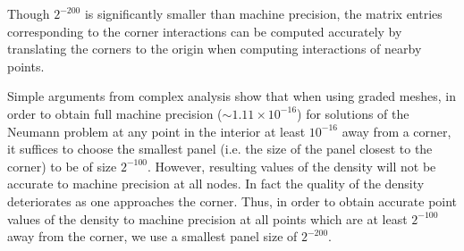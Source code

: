 \begin{rem}
Though $2^{-200}$ is significantly smaller than machine precision, the matrix entries corresponding to the
corner interactions can be computed accurately by translating the corners to the origin when 
computing interactions of nearby points.
\end{rem} 
\begin{rem}
Simple arguments from complex analysis show that when using graded meshes, in order to obtain full 
machine precision 
($\sim 1.11 \times 10^{-16}$) for solutions of the Neumann problem at any point in the interior 
at least $10^{-16}$ away from a corner, it suffices to choose the smallest panel (i.e. the size of the 
panel closest to the corner) to be of size $2^{-100}.$ However, resulting values of the density will not be 
accurate to machine precision at all nodes. In fact the quality
of the density deteriorates as one approaches the corner. Thus, in order to obtain accurate point values
of the density to machine precision at all points which are at least $2^{-100}$ away from the corner, we use a smallest
panel size of $2^{-200}$. 
\end{rem}


